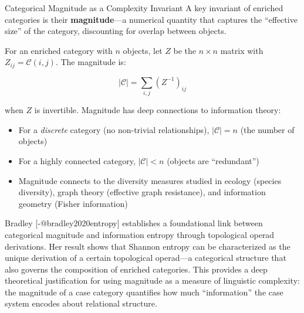 \documentclass[
  ignorenonframetext,
]{beamer}
\providecommand{\tightlist}{%
  \setlength{\itemsep}{0pt}\setlength{\parskip}{0pt}}
\begin{document}
\begin{frame}{Categorical Magnitude as a Complexity Invariant}
\protect{}\label{categorical-magnitude-as-a-complexity-invariant}
A key invariant of enriched categories is their \textbf{magnitude}---a
numerical quantity that captures the ``effective size'' of the category,
discounting for overlap between objects.

For an enriched category with \(n\) objects, let \(Z\) be the
\(n \times n\) matrix with \(Z_{ij} = \mathcal{C}(i, j)\). The magnitude
is:

\[|\mathcal{C}| = \sum_{i,j} (Z^{-1})_{ij} \tag{5.3}\]

when \(Z\) is invertible. Magnitude has deep connections to information
theory:

\begin{itemize}
\tightlist
\item
  For a \emph{discrete} category (no non-trivial relationships),
  \(|\mathcal{C}| = n\) (the number of objects)
\item
  For a highly connected category, \(|\mathcal{C}| < n\) (objects are
  ``redundant'')
\item
  Magnitude connects to the diversity measures studied in ecology
  (species diversity), graph theory (effective graph resistance), and
  information geometry (Fisher information)
\end{itemize}

Bradley {[}-@bradley2020entropy{]} establishes a foundational link
between categorical magnitude and information entropy through
topological operad derivations. Her result shows that Shannon entropy
can be characterized as the unique derivation of a certain topological
operad---a categorical structure that also governs the composition of
enriched categories. This provides a deep theoretical justification for
using magnitude as a measure of linguistic complexity: the magnitude of
a case category quantifies how much ``information'' the case system
encodes about relational structure.
\end{frame}
\end{document}
